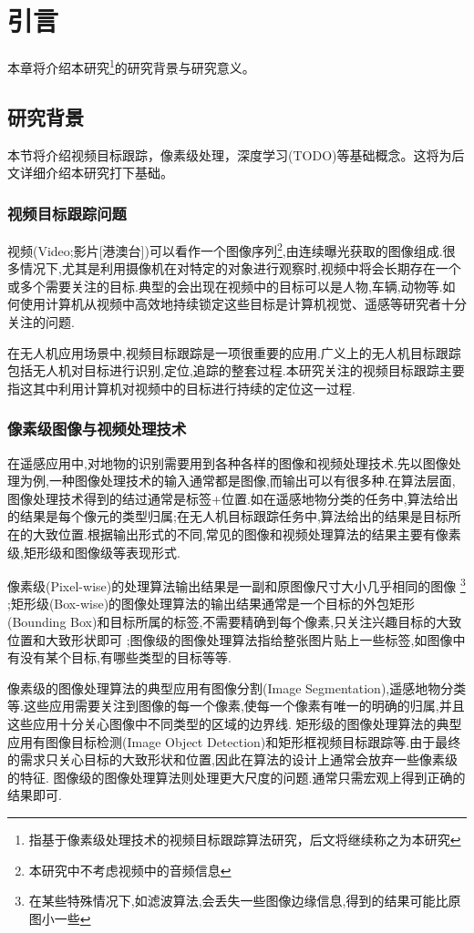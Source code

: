 \chapter{引言}
本章将介绍本研究\footnote{指基于像素级处理技术的视频目标跟踪算法研究，后文将继续称之为本研究}的研究背景与研究意义。

\section{研究背景}
本节将介绍视频目标跟踪，像素级处理，深度学习(TODO)等基础概念。这将为后文详细介绍本研究打下基础。

\subsection{视频目标跟踪问题}
视频(Video;影片[港澳台])可以看作一个图像序列\footnote{本研究中不考虑视频中的音频信息},由连续曝光获取的图像组成.很多情况下,尤其是利用摄像机在对特定的对象进行观察时,视频中将会长期存在一个或多个需要关注的目标.典型的会出现在视频中的目标可以是人物,车辆,动物等.如何使用计算机从视频中高效地持续锁定这些目标是计算机视觉、遥感等研究者十分关注的问题.
\par
在无人机应用场景中,视频目标跟踪是一项很重要的应用.广义上的无人机目标跟踪包括无人机对目标进行识别,定位,追踪的整套过程.本研究关注的视频目标跟踪主要指这其中利用计算机对视频中的目标进行持续的定位这一过程.

\subsection{像素级图像与视频处理技术}
在遥感应用中,对地物的识别需要用到各种各样的图像和视频处理技术.先以图像处理为例,一种图像处理技术的输入通常都是图像,而输出可以有很多种.在算法层面,图像处理技术得到的结过通常是标签+位置.如在遥感地物分类的任务中,算法给出的结果是每个像元的类型归属;在无人机目标跟踪任务中,算法给出的结果是目标所在的大致位置.根据输出形式的不同,常见的图像和视频处理算法的结果主要有像素级,矩形级和图像级等表现形式.
\par
像素级(Pixel-wise)的处理算法输出结果是一副和原图像尺寸大小几乎相同的图像
\footnote{在某些特殊情况下,如滤波算法,会丢失一些图像边缘信息,得到的结果可能比原图小一些}
;矩形级(Box-wise)的图像处理算法的输出结果通常是一个目标的外包矩形(Bounding Box)和目标所属的标签,不需要精确到每个像素,只关注兴趣目标的大致位置和大致形状即可
;图像级的图像处理算法指给整张图片贴上一些标签,如图像中有没有某个目标,有哪些类型的目标等等.
\par
像素级的图像处理算法的典型应用有图像分割(Image Segmentation),遥感地物分类等.这些应用需要关注到图像的每一个像素,使每一个像素有唯一的明确的归属,并且这些应用十分关心图像中不同类型的区域的边界线.
矩形级的图像处理算法的典型应用有图像目标检测(Image Object Detection)和矩形框视频目标跟踪等.由于最终的需求只关心目标的大致形状和位置,因此在算法的设计上通常会放弃一些像素级的特征.
图像级的图像处理算法则处理更大尺度的问题.通常只需宏观上得到正确的结果即可.

